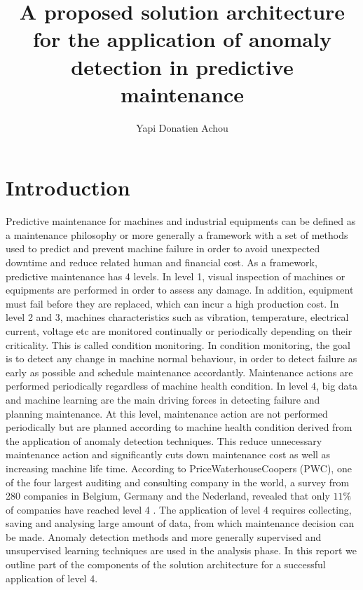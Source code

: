 \documentclass[11pt, oneside]{article}   	%
\title{A proposed solution architecture for the application of anomaly detection in predictive maintenance}
\author{Yapi Donatien Achou}
\begin{document}
\maketitle

\section{Introduction}
Predictive maintenance  for machines and industrial equipments can be defined as a maintenance philosophy or more generally a framework with a set of methods used to predict and prevent machine failure in order to avoid unexpected downtime and reduce related human and financial cost. 
\justify
As a framework, predictive maintenance has 4 levels. In level 1, visual inspection of machines or equipments are performed in order to assess any damage.
In addition, equipment must fail before they are replaced, which can incur a high production cost. In level 2 and 3, machines characteristics such as vibration, temperature, electrical current, voltage etc are monitored continually or periodically depending on their criticality. This is called condition monitoring. In condition monitoring, the goal is to detect any change in machine normal behaviour, in order to detect failure as early as possible and schedule maintenance accordantly. Maintenance actions are performed periodically regardless of machine health condition. In level 4, big data and machine learning are the main driving forces in detecting failure and planning maintenance. At this level, maintenance action are not performed periodically but are planned according to machine health condition derived from the application of anomaly detection techniques. This reduce unnecessary maintenance action and significantly cuts down maintenance cost as well as increasing machine life time.
\justify
According to PriceWaterhouseCoopers (PWC), one of the four largest auditing and consulting company in the world,  a survey from 280 companies in Belgium, Germany and the Nederland, revealed that only 
$11 \%$ of companies have reached level 4 \cite{pwc}. The application of level 4 requires collecting, saving and analysing large amount of data, from which maintenance decision can be made. Anomaly detection methods and more generally supervised and unsupervised learning techniques are used in the analysis phase.
\justify
In this report we outline part of the components of the solution architecture for a successful application of level 4. 
\end{document}
